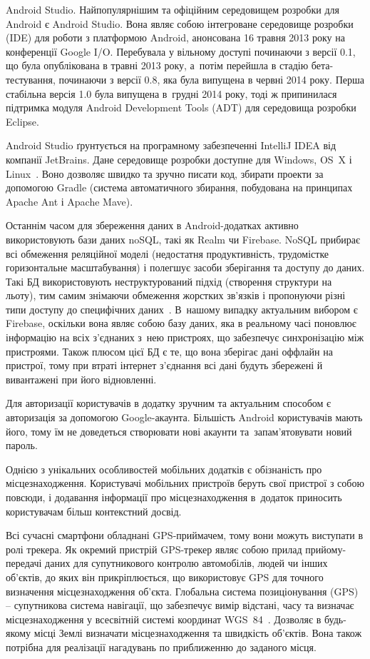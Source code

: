 \documentclass[../main.tex]{subfiles}
\begin{document}
Android Studio.
Найпопулярнішим та офіційним середовищем розробки для Android є Android Studio. Вона являє собою інтегроване середовище розробки (IDE) для роботи з платформою Android, анонсована 16 травня 2013 року на конференції Google I/O. Перебувала у вільному доступі починаючи з версії 0.1, що була опублікована в травні 2013 року, а~потім перейшла в стадію бета-тестування, починаючи з версії 0.8, яка була випущена в червні 2014 року. Перша стабільна версія 1.0 була випущена в~грудні 2014 року, тоді ж припинилася підтримка модуля Android Development Tools (ADT) для середовища розробки Eclipse.

Android Studio ґрунтується на програмному забезпеченні IntelliJ IDEA від компанії JetBrains. Дане середовище розробки доступне для Windows, OS~X і Linux~\cite{android_studio}. Воно дозволяє швидко та зручно писати код, збирати проекти за допомогою Gradle (система автоматичного збирання, побудована на принципах Apache Ant і Apache Mave).

\newpage
Останнім часом для збереження даних в Android-додатках активно використовують бази даних noSQL, такі як Realm чи Firebase. NoSQL прибирає всі обмеження реляційної моделі (недостатня продуктивність, трудомістке горизонтальне масштабування) і полегшує засоби зберігання та доступу до даних. Такі БД використовують неструктурований підхід (створення структури на льоту), тим самим знімаючи обмеження жорстких зв'язків і пропонуючи різні типи доступу до специфічних даних~\cite{nosql}. В~нашому випадку актуальним вибором є Firebase, оскільки вона являє собою базу даних, яка в реальному часі поновлює інформацію на всіх з'єднаних з~нею пристроях, що забезпечує синхронізацію між пристроями. Також плюсом цієї БД є те, що вона зберігає дані оффлайн на пристрої, тому при втраті інтернет з'єднання всі дані будуть збережені й вивантажені при його відновленні.

Для авторизації користувачів в додатку зручним та актуальним способом є авторизація за допомогою Google-акаунта. Більшість Android користувачів мають його, тому їм не доведеться створювати нові акаунти та~запам'ятовувати новий пароль.

Однією з унікальних особливостей мобільних додатків є обізнаність про місцезнаходження. Користувачі мобільних пристроїв беруть свої пристрої з собою повсюди, і додавання інформації про місцезнаходження в~додаток приносить користувачам більш контекстний досвід. 

Всі сучасні смартфони обладнані GPS-приймачем, тому вони можуть виступати в ролі трекера.  Як окремий пристрій GPS-трекер являє собою прилад прийому-передачі даних для супутникового контролю автомобілів, людей чи інших об'єктів, до яких він прикріплюється, що використовує GPS для точного визначення місцезнаходження об'єкта. Глобальна система позиціонування (GPS) – супутникова система навігації, що забезпечує вимір відстані, часу та визначає місцезнаходження у всесвітній системі координат WGS~84~\cite{gps}. Дозволяє в будь-якому місці Землі визначати місцезнаходження та швидкість об'єктів. Вона також потрібна для реалізації нагадувань по приближенню до заданого місця.
\end{document}

